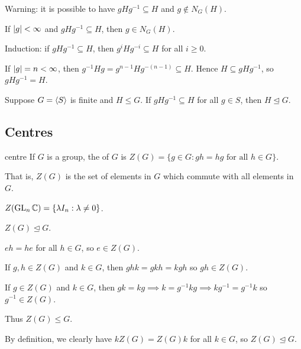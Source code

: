\documentclass[12pt,letterpaper]{report}
\begin{document}
Warning: it is possible to have $gHg^{-1} \subseteq H$ and $g \not\in N_G(H)$.

\begin{lem}{}{}
  If $\lvert g\rvert < \infty$ and $gHg^{-1} \subseteq H$, then $g \in N_G(H)$.
\end{lem}

\begin{thmproof}
  Induction: if $gHg^{-1} \subseteq H$, then $g^iHg^{-i} \subseteq H$ for all $i \geq 0$.

  If $\lvert g\rvert = n < \infty$, then $g^{-1}Hg = g^{n - 1}Hg^{-(n - 1)} \subseteq H$.
  Hence $H \subseteq gHg^{-1}$, so $gHg^{-1} = H$.
\end{thmproof}

\begin{cor}{}{}
  Suppose $G = \langle S\rangle$ is finite and $H \leq G$.
  If $gHg^{-1} \subseteq H$ for all $g \in S$, then $H \trianglelefteq G$.
\end{cor}

\pagebreak
\subsection{Centres}

\begin{defn}{centre}{}
  If $G$ is a group, the  of $G$ is
  $Z(G) = \{g \in G : gh = hg \text{ for all } h \in G\}$.
\end{defn}

That is, $Z(G)$ is the set of elements in $G$ which commute with all elements in $G$.

\begin{ex}
  $Z(\operatorname{GL}_n\mathbb{C}) = \{\lambda I_n : \lambda \neq 0\}$.
\end{ex}

\begin{prop}{}{}
  $Z(G) \trianglelefteq G$.
\end{prop}

\begin{thmproof}
  $eh = he$ for all $h \in G$, so $e \in Z(G)$.

  If $g, h \in Z(G)$ and $k \in G$, then $ghk = gkh = kgh$ so $gh \in Z(G)$.

  If $g \in Z(G)$ and $k \in G$, then $gk = kg \implies k = g^{-1}kg \implies kg^{-1} = g^{-1}k$ so
  $g^{-1} \in Z(G)$.

  Thus $Z(G) \leq G$.

  By definition, we clearly have $kZ(G) = Z(G)k$ for all $k \in G$, so $Z(G) \trianglelefteq G$.
\end{thmproof}
\end{document}

